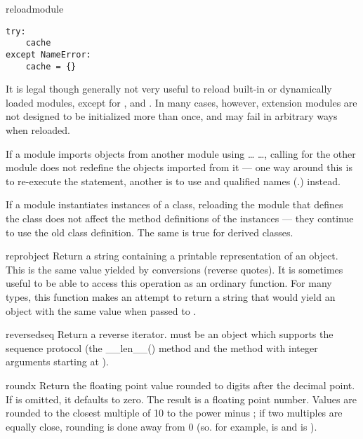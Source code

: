 \begin{funcdesc}{reload}{module}
\begin{verbatim}
try:
    cache
except NameError:
    cache = {}
\end{verbatim}


  It is legal though generally not very useful to reload built-in or
  dynamically loaded modules, except for ,
   and .  In
  many cases, however, extension modules are not designed to be
  initialized more than once, and may fail in arbitrary ways when
  reloaded.

  If a module imports objects from another module using 
  \ldots{}  \ldots{}, calling  for
  the other module does not redefine the objects imported from it ---
  one way around this is to re-execute the  statement,
  another is to use  and qualified names
  (.) instead.

  If a module instantiates instances of a class, reloading the module
  that defines the class does not affect the method definitions of the
  instances --- they continue to use the old class definition.  The
  same is true for derived classes.
\end{funcdesc}

\begin{funcdesc}{repr}{object}
  Return a string containing a printable representation of an object.
  This is the same value yielded by conversions (reverse quotes).
  It is sometimes useful to be able to access this operation as an
  ordinary function.  For many types, this function makes an attempt
  to return a string that would yield an object with the same value
  when passed to .
\end{funcdesc}

\begin{funcdesc}{reversed}{seq}
  Return a reverse iterator.   must be an object which
  supports the sequence protocol (the __len__() method and the
   method with integer arguments starting at
  ).
\end{funcdesc}

\begin{funcdesc}{round}{x}
  Return the floating point value  rounded to  digits
  after the decimal point.  If  is omitted, it defaults to zero.
  The result is a floating point number.  Values are rounded to the
  closest multiple of 10 to the power minus ; if two multiples
  are equally close, rounding is done away from 0 (so. for example,
   is  and  is ).
\end{funcdesc}

